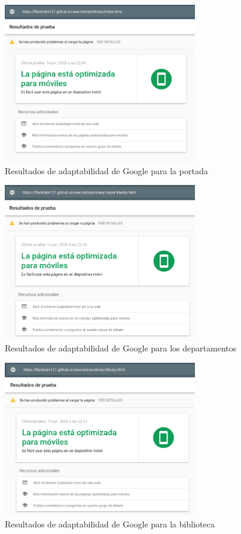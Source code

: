 \documentclass[11pt]{article}
\begin{document}
\begin{figure}[h]
    \centering
    \includegraphics[width=0.75\textwidth]{google1.png}
    \caption{Resultados de adaptabilidad de Google para la portada}
\end{figure}

\begin{figure}[h]
    \centering
    \includegraphics[width=0.75\textwidth]{google2.png}
    \caption{Resultados de adaptabilidad de Google para los departamentos}
\end{figure}

\begin{figure}[h]
    \centering
    \includegraphics[width=0.75\textwidth]{google3.png}
    \caption{Resultados de adaptabilidad de Google para la biblioteca}
\end{figure}
\end{document}
